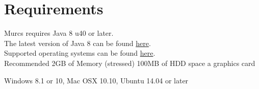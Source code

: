 \section{Requirements}

Murcs requires Java 8 u40 or later.\\
The latest version of Java 8 can be found  \href{http://www.oracle.com/technetwork/java/javase/downloads/index-jsp-138363.html}{here}.\\
Supported operating systems can be found
\href{http://www.oracle.com/technetwork/java/javase/certconfig-2095354.html}{here}.\\

Recommended
2GB of Memory (stressed)
100MB of HDD space
a graphics card

Windows 8.1 or 10, Mac OSX 10.10, Ubuntu 14.04 or later

